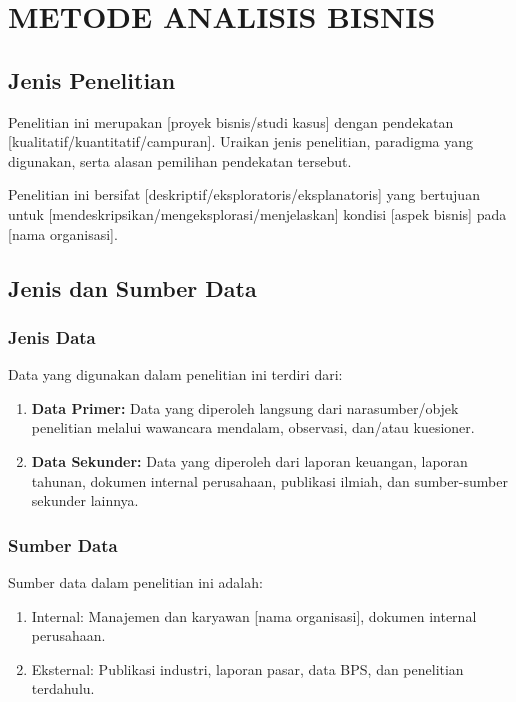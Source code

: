 
\chapter{METODE ANALISIS BISNIS}
\label{bab:metode-bisnis}

\section{Jenis Penelitian}
\label{sec:jenis-penelitian-bisnis}

Penelitian ini merupakan [proyek bisnis/studi kasus] dengan pendekatan
[kualitatif/kuantitatif/campuran]. Uraikan jenis penelitian, paradigma yang digunakan,
serta alasan pemilihan pendekatan tersebut.

Penelitian ini bersifat [deskriptif/eksploratoris/eksplanatoris] yang bertujuan untuk
[mendeskripsikan/mengeksplorasi/menjelaskan] kondisi [aspek bisnis] pada [nama organisasi].

\section{Jenis dan Sumber Data}
\label{sec:jenis-sumber-data}

\subsection{Jenis Data}
Data yang digunakan dalam penelitian ini terdiri dari:
\begin{enumerate}
  \item \textbf{Data Primer:} Data yang diperoleh langsung dari narasumber/objek
        penelitian melalui wawancara mendalam, observasi, dan/atau kuesioner.
  \item \textbf{Data Sekunder:} Data yang diperoleh dari laporan keuangan, laporan
        tahunan, dokumen internal perusahaan, publikasi ilmiah, dan sumber-sumber
        sekunder lainnya.
\end{enumerate}

\subsection{Sumber Data}
Sumber data dalam penelitian ini adalah:
\begin{enumerate}
  \item Internal: Manajemen dan karyawan [nama organisasi], dokumen internal perusahaan.
  \item Eksternal: Publikasi industri, laporan pasar, data BPS, dan penelitian terdahulu.
\end{enumerate}


